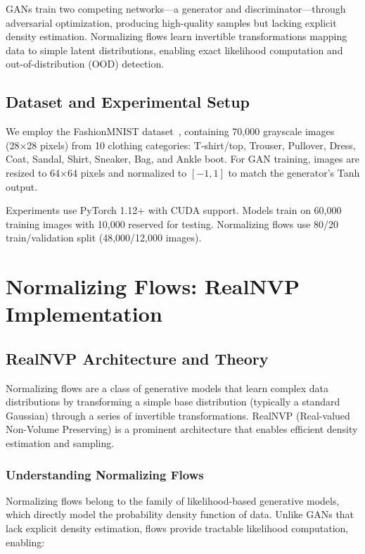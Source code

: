 \documentclass[conference,12pt]{IEEEtran}
\begin{document}
GANs train two competing networks—a generator and discriminator—through adversarial optimization, producing high-quality samples but lacking explicit density estimation. Normalizing flows learn invertible transformations mapping data to simple latent distributions, enabling exact likelihood computation and out-of-distribution (OOD) detection.

\subsection{Dataset and Experimental Setup}

We employ the FashionMNIST dataset~\cite{xiao2017fashion}, containing 70,000 grayscale images (28×28 pixels) from 10 clothing categories: T-shirt/top, Trouser, Pullover, Dress, Coat, Sandal, Shirt, Sneaker, Bag, and Ankle boot. For GAN training, images are resized to 64×64 pixels and normalized to $[-1,1]$ to match the generator's Tanh output.

Experiments use PyTorch 1.12+ with CUDA support. Models train on 60,000 training images with 10,000 reserved for testing. Normalizing flows use 80/20 train/validation split (48,000/12,000 images).

\section{Normalizing Flows: RealNVP Implementation}

\subsection{RealNVP Architecture and Theory}

Normalizing flows are a class of generative models that learn complex data distributions by transforming a simple base distribution (typically a standard Gaussian) through a series of invertible transformations. RealNVP (Real-valued Non-Volume Preserving) is a prominent architecture that enables efficient density estimation and sampling.

\subsubsection{Understanding Normalizing Flows}

Normalizing flows belong to the family of likelihood-based generative models, which directly model the probability density function of data. Unlike GANs that lack explicit density estimation, flows provide tractable likelihood computation, enabling:
\end{document}
